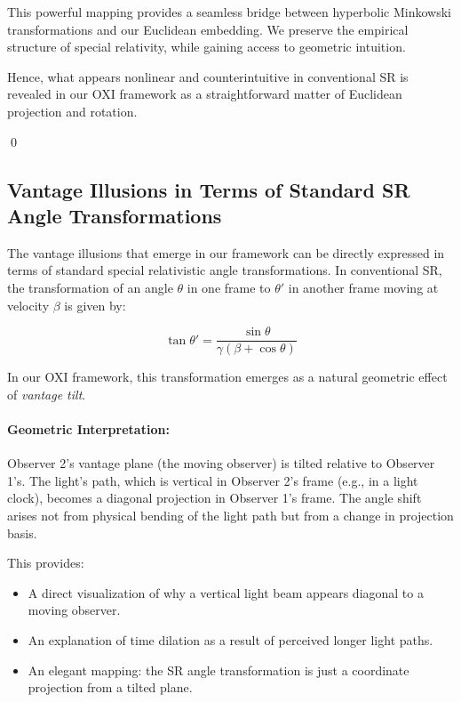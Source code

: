 \documentclass{article}
\begin{document}
This powerful mapping provides a seamless bridge between hyperbolic Minkowski transformations and our Euclidean embedding. We preserve the empirical structure of special relativity, while gaining access to geometric intuition.

Hence, what appears nonlinear and counterintuitive in conventional SR is revealed in our OXI framework as a straightforward matter of Euclidean projection and rotation.

\qed




\subsection{Vantage Illusions in Terms of Standard SR Angle Transformations}

The vantage illusions that emerge in our framework can be directly expressed in terms of standard special relativistic angle transformations. In conventional SR, the transformation of an angle $\theta$ in one frame to $\theta'$ in another frame moving at velocity $\beta$ is given by:

\begin{equation}
\tan\theta' = \frac{\sin\theta}{\gamma(\beta + \cos\theta)}
\end{equation}

In our OXI framework, this transformation emerges as a natural geometric effect of \textit{vantage tilt}.

\paragraph{Geometric Interpretation:} Observer 2's vantage plane (the moving observer) is tilted relative to Observer 1's. The light's path, which is vertical in Observer 2's frame (e.g., in a light clock), becomes a diagonal projection in Observer 1's frame. The angle shift arises not from physical bending of the light path but from a change in projection basis.

This provides:
\begin{itemize}
  \item A direct visualization of why a vertical light beam appears diagonal to a moving observer.
  \item An explanation of time dilation as a result of perceived longer light paths.
  \item An elegant mapping: the SR angle transformation is just a coordinate projection from a tilted plane.
\end{itemize}
\end{document}
